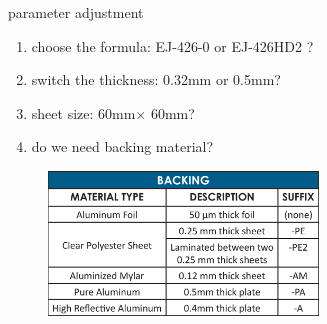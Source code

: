 \documentclass[11pt,compress,xcolor=x11names,UTF8]{beamer}
\begin{document}
\begin{frame}{parameter adjustment}
\begin{enumerate}
\item choose the formula: EJ-426-0 or EJ-426HD2 ?
\item switch the thickness: 0.32mm or 0.5mm?
\item sheet size: 60mm$\times$ 60mm?
\item do we need backing material?
\end{enumerate}
\begin{figure}
\centering
\includegraphics[width=0.64\textwidth]{currentfig/backing.png} %
\end{figure}
\end{frame}
\end{document}
